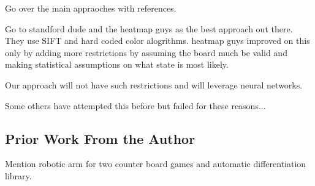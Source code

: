 Go over the main appraoches with references.

Go to standford dude and the heatmap guys 
as the best approach out there. They use SIFT and hard coded color alogrithms.  heatmap guys improved on this 
only by adding more restrictions by assuming the board much be valid and making statistical assumptions on 
what state is most likely.

Our approach will not have such restrictions and will leverage neural networks.

Some others have attempted this before but failed for these reasons...


\subsection{Prior Work From the Author}
Mention robotic arm for two counter board games and automatic differentiation library.
